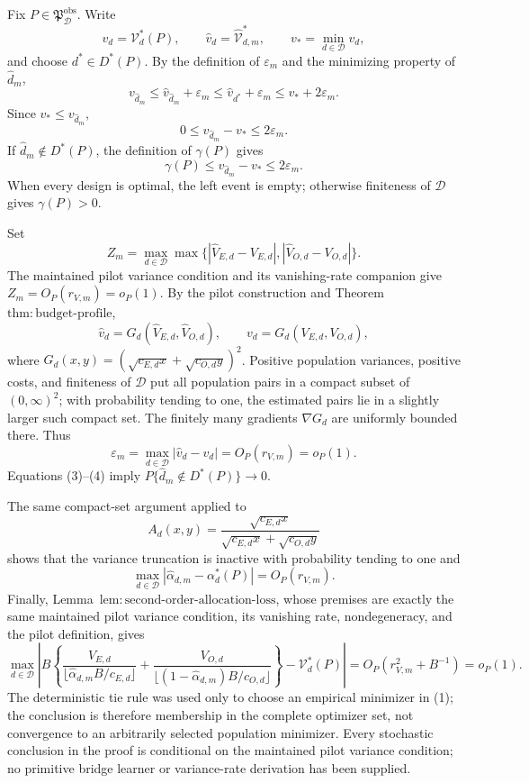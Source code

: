 Fix \(P\in\mathfrak P_{\mathcal D}^{\mathrm{obs}}\).  Write
\[
 v_d=\mathcal V_d^*(P),\qquad
 \widehat v_d=\widehat{\mathcal V}_{d,m}^*,
 \qquad v_*=\min_{d\in\mathcal D}v_d,
\]
and choose \(d^*\in D^*(P)\).  By the definition of \(\varepsilon_m\) and the minimizing property of \(\widehat d_m\),
\[
 v_{\widehat d_m}
 \le \widehat v_{\widehat d_m}+\varepsilon_m
 \le \widehat v_{d^*}+\varepsilon_m
 \le v_*+2\varepsilon_m. \tag{1}
\]
Since \(v_*\le v_{\widehat d_m}\),
\[
 0\le v_{\widehat d_m}-v_*\le2\varepsilon_m. \tag{2}
\]
If \(\widehat d_m\notin D^*(P)\), the definition of \(\gamma(P)\) gives
\[
 \gamma(P)\le v_{\widehat d_m}-v_*\le2\varepsilon_m. \tag{3}
\]
When every design is optimal, the left event is empty; otherwise finiteness of \(\mathcal D\) gives \(\gamma(P)>0\).

Set
\[
 Z_m=\max_{d\in\mathcal D}\max\bigl\{|\widehat V_{E,d}-V_{E,d}|,
 |\widehat V_{O,d}-V_{O,d}|\bigr\}.
\]
The maintained pilot variance condition and its vanishing-rate companion give \(Z_m=O_P(r_{V,m})=o_P(1)\).  By the pilot construction and Theorem~\(\mathrm{thm{:}budget\text{-}profile}\),
\[
 \widehat v_d=G_d(\widehat V_{E,d},\widehat V_{O,d}),
 \qquad v_d=G_d(V_{E,d},V_{O,d}),
\]
where \(G_d(x,y)=(\sqrt{c_{E,d}x}+\sqrt{c_{O,d}y})^2\).  Positive population variances, positive costs, and finiteness of \(\mathcal D\) put all population pairs in a compact subset of \((0,\infty)^2\); with probability tending to one, the estimated pairs lie in a slightly larger such compact set.  The finitely many gradients \(\nabla G_d\) are uniformly bounded there.  Thus
\[
 \varepsilon_m=\max_{d\in\mathcal D}|\widehat v_d-v_d|
 =O_P(r_{V,m})=o_P(1). \tag{4}
\]
Equations (3)--(4) imply \(P\{\widehat d_m\notin D^*(P)\}\to0\).

The same compact-set argument applied to
\[
 A_d(x,y)=\frac{\sqrt{c_{E,d}x}}
 {\sqrt{c_{E,d}x}+\sqrt{c_{O,d}y}}
\]
shows that the variance truncation is inactive with probability tending to one and
\[
 \max_{d\in\mathcal D}|\widehat\alpha_{d,m}-\alpha_d^*(P)|
 =O_P(r_{V,m}). \tag{5}
\]
Finally, Lemma~\(\mathrm{lem{:}second\text{-}order\text{-}allocation\text{-}loss}\), whose premises are exactly the same maintained pilot variance condition, its vanishing rate, nondegeneracy, and the pilot definition, gives
\[
\max_{d\in\mathcal D}\left|B\left\{
\frac{V_{E,d}}{\lfloor\widehat\alpha_{d,m}B/c_{E,d}\rfloor}
+\frac{V_{O,d}}{\lfloor(1-\widehat\alpha_{d,m})B/c_{O,d}\rfloor}
\right\}-\mathcal V_d^*(P)\right|
=O_P(r_{V,m}^2+B^{-1})=o_P(1).
\]
The deterministic tie rule was used only to choose an empirical minimizer in (1); the conclusion is therefore membership in the complete optimizer set, not convergence to an arbitrarily selected population minimizer.  Every stochastic conclusion in the proof is conditional on the maintained pilot variance condition; no primitive bridge learner or variance-rate derivation has been supplied.